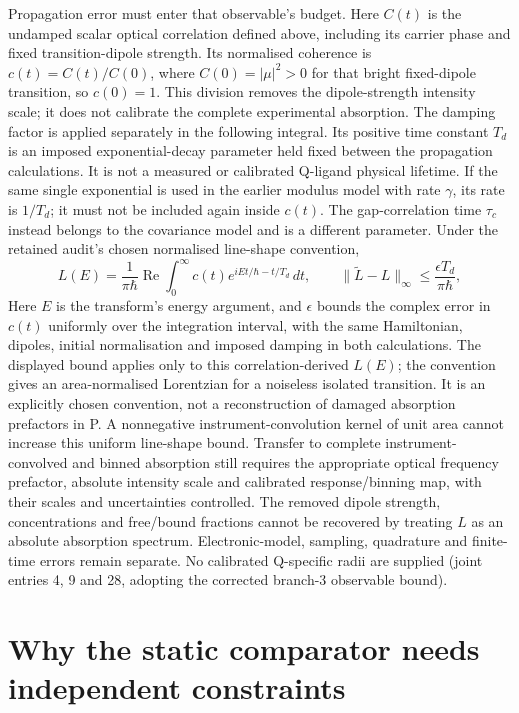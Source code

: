 \documentclass{article}
\begin{document}
Propagation error must enter that observable's budget. Here \(C(t)\) is the undamped scalar optical correlation defined above, including its carrier phase and fixed transition-dipole strength. Its normalised coherence is \(c(t)=C(t)/C(0)\), where \(C(0)=|\mu|^2>0\) for that bright fixed-dipole transition, so \(c(0)=1\). This division removes the dipole-strength intensity scale; it does not calibrate the complete experimental absorption. The damping factor is applied separately in the following integral. Its positive time constant \(T_d\) is an imposed exponential-decay parameter held fixed between the propagation calculations. It is not a measured or calibrated Q-ligand physical lifetime. If the same single exponential is used in the earlier modulus model with rate \(\gamma\), its rate is \(1/T_d\); it must not be included again inside \(c(t)\). The gap-correlation time \(\tau_c\) instead belongs to the covariance model and is a different parameter. Under the retained audit's chosen normalised line-shape convention,
\[
 L(E)=\frac{1}{\pi\hbar}\operatorname{Re}
 \int_0^\infty c(t)e^{iEt/\hbar-t/T_d}\,dt,
 \qquad
 \|\widetilde L-L\|_\infty\leq\frac{\epsilon T_d}{\pi\hbar},
\]
Here \(E\) is the transform's energy argument, and \(\epsilon\) bounds the complex error in \(c(t)\) uniformly over the integration interval, with the same Hamiltonian, dipoles, initial normalisation and imposed damping in both calculations. The displayed bound applies only to this correlation-derived \(L(E)\); the convention gives an area-normalised Lorentzian for a noiseless isolated transition. It is an explicitly chosen convention, not a reconstruction of damaged absorption prefactors in P. A nonnegative instrument-convolution kernel of unit area cannot increase this uniform line-shape bound. Transfer to complete instrument-convolved and binned absorption still requires the appropriate optical frequency prefactor, absolute intensity scale and calibrated response/binning map, with their scales and uncertainties controlled. The removed dipole strength, concentrations and free/bound fractions cannot be recovered by treating \(L\) as an absolute absorption spectrum. Electronic-model, sampling, quadrature and finite-time errors remain separate. No calibrated Q-specific radii are supplied (joint entries 4, 9 and 28, adopting the corrected branch-3 observable bound).

\section{Why the static comparator needs independent constraints}
\end{document}
